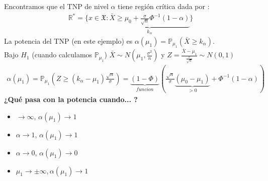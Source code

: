 \documentclass[10pt]{article}
\theoremstyle{plain}
\theoremstyle{definition}
\begin{document}
Encontramos que el TNP de nivel $\alpha$ tiene región crítica dada por :
\begin{align*}
\mathbb{R}^* = \{x\in \mathfrak{X}\colon \underbrace{\bar{X}\ge \mu_{0}+ \frac{\sigma}{\sqrt{n}}\Phi^{-1}(1-\alpha)}_{k_{\alpha}}\}
\end{align*}
La potencia del TNP (en este ejemplo) es $\alpha(\mu_{1}) = \mathbb{P}_{\mu_{1}}(\bar{X}\ge k_{\alpha})$.\\
Bajo $H_{1}$ (cuando calculamos $\mathbb{P}_{\mu_{1}}$) $\bar{X} \sim N(\mu_{1},\frac{\sigma^2}{n})$ y $Z = \frac{\bar{X}-\mu_{1}}{\frac{\sigma}{\sqrt{n}}} \sim N(0,1)$ 
\begin{align*}
\alpha(\mu_{1}) = \mathbb{P}_{\mu_{1}}\left(Z \ge (k_{\alpha}-\mu_{1})\frac{\sqrt{n}}{\sigma}\right) = \underbrace{(1-\Phi)}_{funcion}\left(\frac{\sqrt{n}}{\sigma}\underbrace{(\mu_{0}-\mu_{1})}_{>0}+\Phi^{-1}(1-\alpha)\right)
\end{align*}
\textbf{¿Qué pasa con la potencia cuando... ?}
\begin{itemize}
\item $\rightarrow \infty$, $\alpha(\mu_{1}) \rightarrow 1$
\item $\alpha \rightarrow 1$, $\alpha(\mu_{1}) \rightarrow 1$
\item $\alpha \rightarrow 0$, $\alpha(\mu_{1}) \rightarrow 0$
\item $\mu_{1} \rightarrow \pm\infty, \alpha(\mu_{1}) \rightarrow 1$
\end{itemize}
\end{document}
